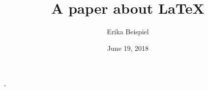 \begin{titlingpage}
	\newlength{\logoheight}	\setlength{\logoheight}{5cm}
	\setlength{\droptitle}{-3em}
	
	\renewcommand{\maketitlehooka}{%
		\begin{center}
			{\Large Unglaublich Tolle Hochschule Stadt\par\noindent}
			Lehrstuhl L, TeX-Systems\\
			Prof. Dr. Max Mustermann\\
			\vspace*{2cm}
			{\LARGE\scshape Master Thesis}
			\vspace*{1.5em}
		\end{center}
	}
	\pretitle{\begin{center}\bfseries\HUGE\color{rwth-75}}
		\title{A paper about LaTeX}
	\posttitle{\end{center}\vskip 4em}
	
	\preauthor{\begin{center}\Large}
		\author{Erika Beispiel}
	\postauthor{\end{center}\vskip 2em}
	
	\predate{\begin{center}\Large}
	\date{June 19, 2018} %
	\postdate{\end{center}\vskip 2em}

    \renewcommand{\maketitlehookd}{%
    	\vfill
    \centerfloat
    \begin{tabular}{>{\sffamily\color{rwth}}r>{}l}
    	Advisor			& Dr. Peter Meyer\\ %
    	\nth{1} Supervisor		& Prof. Dr. Max Mustermann\\ %
    	\nth{2} Supervisor 		& Prof. Dr. Erika Mustermann\\ %
    	
    \end{tabular}
	}
	\calccentering{\unitlength}
	\begin{adjustwidth*}{\unitlength}{-\unitlength}
		\maketitle
	\end{adjustwidth*}
\end{titlingpage}
